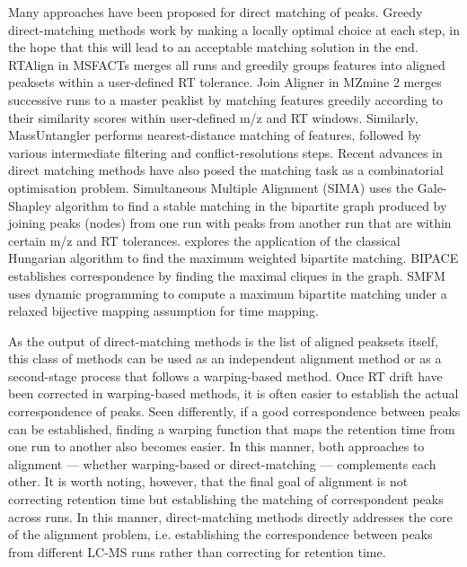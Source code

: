 Many approaches have been proposed for direct matching of peaks. Greedy direct-matching methods work by making a locally optimal choice at each step, in the hope that this will lead to an acceptable matching solution in the end. RTAlign in MSFACTs \cite{Duran2003} merges all runs and greedily groups features into aligned peaksets within a user-defined RT tolerance. Join Aligner \cite{Pluskal2010} in MZmine 2 merges successive runs to a master peaklist by matching features greedily according to their similarity scores within user-defined m/z and RT windows. Similarly, MassUntangler \cite{Ballardini2011} performs nearest-distance matching of features, followed by various intermediate filtering and conflict-resolutions steps. Recent advances in direct matching methods have also posed the matching task as a combinatorial optimisation problem. Simultaneous Multiple Alignment (SIMA) \cite{Voss2011a} uses the Gale-Shapley algorithm to find a stable matching in the bipartite graph produced by joining peaks (nodes) from one run with peaks from another run that are within certain m/z and RT tolerances. \cite{Wang2013} explores the application of the classical Hungarian algorithm to find the maximum weighted bipartite matching. BIPACE \cite{Hoffmann2012a} establishes correspondence by finding the maximal cliques in the graph. SMFM \cite{Lin2013} uses dynamic programming to compute a maximum bipartite matching under a relaxed bijective mapping assumption for time mapping.

As the output of direct-matching methods is the list of aligned peaksets itself, this class of methods can be used as an independent alignment method or as a second-stage process that follows a warping-based method. Once RT drift have been corrected in warping-based methods, it is often easier to establish the actual correspondence of peaks. Seen differently, if a good correspondence between peaks can be established, finding a warping function that maps the retention time from one run to another also becomes easier. In this manner, both approaches to alignment --- whether warping-based or direct-matching --- complements each other. It is worth noting, however, that the final goal of alignment is not correcting retention time but establishing the matching of correspondent peaks across runs. In this manner, direct-matching methods directly addresses the core of the alignment problem, i.e. establishing the correspondence between peaks from different LC-MS runs rather than correcting for retention time.

